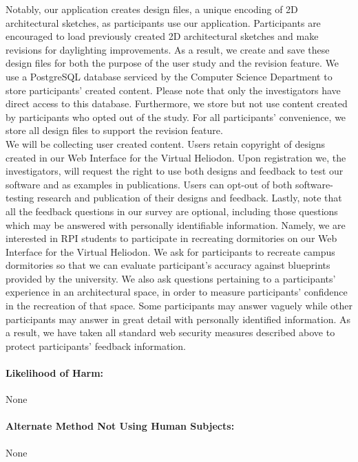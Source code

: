 \documentclass[12pt]{article}
\begin{document}
Notably, our application creates design files, a unique encoding of 2D architectural sketches, as participants  use our application.
Participants are encouraged to load previously created 2D architectural sketches and make revisions for daylighting improvements.
As a result, we create and save these design files for both the purpose of the user study and the revision feature. 
We use a PostgreSQL database serviced by the Computer Science Department to store participants' created content. 
Please note that only the investigators have direct access to this database. Furthermore, we store but not use content created by participants who opted out of the study. 
For all participants' convenience, we store all design files to support the revision feature. \\

We will be collecting user created content. 
Users retain copyright of designs created in our Web Interface for the Virtual Heliodon.  
Upon registration we, the investigators, will request the right to use both designs and feedback to test our software and as examples in publications.
Users can opt-out of both software-testing research and publication of their designs and feedback.
Lastly, note that all the feedback questions in our survey are optional, including those questions which may be answered with personally identifiable information. 
Namely, we are interested in RPI students to participate in recreating dormitories on our Web Interface for the Virtual Heliodon.
We ask for participants to recreate campus dormitories so that we can evaluate participant's accuracy against blueprints provided by the university.
We also ask questions pertaining to a participants' experience in an architectural space, in order to measure participants' confidence in the recreation of that space.
Some participants may answer vaguely while other participants may answer in great detail with personally identified information.
As a result, we have taken all standard web security measures described above to protect participants' feedback information.

\paragraph{Likelihood of  Harm:}   None

\paragraph{Alternate Method Not Using Human Subjects:} None
\end{document}

